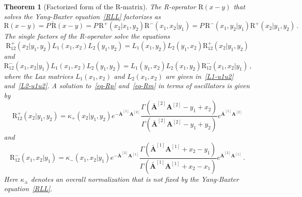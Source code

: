 \documentclass[11pt]{article}
\numberwithin{equation}{section}
\newtheorem{theorem}{Theorem}[section]
\newcommand{\OA}{\mathbf{A}}
\newcommand{\OAD}{\mathbf{\bar{A}}}
\newcommand{\abrOSCR}{\mathrm{R}}
\begin{document}
		\begin{theorem}[Factorized form of the R-matrix]\label{Theorem-main}
	The R-operator $\abrOSCR(x-y)$ that solves the Yang-Baxter equation~\eqref{RLL} factorizes as
		 \begin{equation}\label{Facrtorized-R}
		 	{\abrOSCR}(x-y) =P\,\check {\abrOSCR}(x-y)=P \,{\abrOSCR}^+(x_2|x_1,y_2){\abrOSCR}^-(x_1,x_2|y_1)=P\, {\abrOSCR}^-(x_1,y_2|y_1){\abrOSCR}^+(x_2|y_1,y_2)\,.
		 \end{equation}
The single factors of the R-operator solve the equations
		\begin{equation}\label{eq-Rp}
			{\abrOSCR}^+_{12}(x_2|y_1,y_2) L_1(x_1,x_2)L_2(y_1,y_2)=L_1(x_1,y_2)L_2(y_1,x_2){\abrOSCR}^+_{12}(x_2|y_1,y_2)
		\end{equation} 
		and 
		\begin{equation}\label{eq-Rm}
			{\abrOSCR}^-_{12}(x_1,x_2|y_1) L_1(x_1,x_2)L_2(y_1,y_2)=L_1(y_1,x_2)L_2(x_1,y_2){\abrOSCR}^-_{12}(x_1,x_2|y_1)\,,
		\end{equation} 
        where the Lax matrices $L_1(x_1,x_2)$ and $L_2(x_1,x_2)$ are  given in~\eqref{L1-u1u2} and~\eqref{L2-u1u2}.
		 A solution  to~\eqref{eq-Rp} and~\eqref{eq-Rm}  in terms of oscillators is given by
		\begin{equation}\label{Rp-solution}
			{\abrOSCR}_{12}^+(x_2|y_1,y_2) =\kappa_+(x_2|y_1,y_2)e^{-\OAD^{[1]}\OA^{[2]}}\frac{\Gamma(\OAD^{[2]}\OA^{[2]}-y_1+x_2)}{\Gamma(\OAD^{[2]}\OA^{[2]}-y_1+y_2)}e^{\OAD^{[1]}\OA^{[2]}}
		\end{equation}
		and
		\begin{equation}\label{Rm-solution}
			{\abrOSCR}_{12}^-(x_1,x_2|y_1)=\kappa_-(x_1,x_2|y_1)e^{-\OAD^{[2]}\OA^{[1]}}\frac{\Gamma(\OAD^{[1]}\OA^{[1]}+x_2-y_1)}{\Gamma(\OAD^{[1]}\OA^{[1]}+x_2-x_1)}e^{\OAD^{[2]}\OA^{[1]}}\,.
		\end{equation}
		{Here $\kappa_{\pm}$ denotes an overall normalization that is not fixed by the Yang-Baxter equation~\eqref{RLL}. }
		 		\end{theorem}
\end{document}
